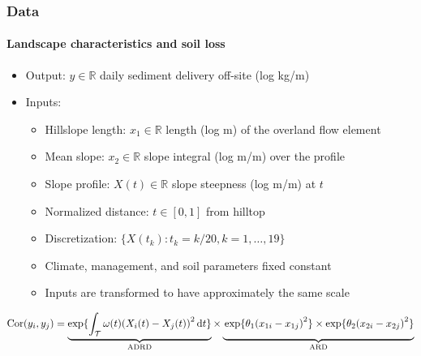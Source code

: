 \documentclass{snedecorbeamer}
\begin{document}
\begin{frame}
  \frametitle{Data}
  \framesubtitle{Landscape characteristics and soil loss}

  \begin{itemize}
  \item Output: $y\in\mathbb{R}$ daily sediment delivery off-site (log kg/m)
  \item Inputs:
    \begin{itemize}
    \item Hillslope length: $x_1\in\mathbb{R}$ length (log m) of the overland flow
      element
    \item Mean slope: $x_2\in\mathbb{R}$ slope integral (log m/m) over the profile
    \item Slope profile: $X(t)\in\mathbb{R}$ slope steepness (log m/m) at $t$
    \item Normalized distance: $t\in[0, 1]$ from hilltop
    \item Discretization: $\{X(t_k) : t_k = k / 20, k = 1, \dots, 19\}$
    \item Climate, management, and soil parameters fixed constant
    \item Inputs are transformed to have approximately the same scale
    \end{itemize}
  \end{itemize}

  \vfill

  $\mathrm{Cor}(y_i, y_j) =
  \underbrace{\exp\{
    \int_\mathcal{T}
    \omega(t){(X_i(t) - X_j(t))}^2\,\mathrm{d}t\}
  }_{\mathrm{ADRD}}
  \times
  \underbrace{
    \vphantom{\int_\mathcal{T}}
      \exp\{\theta_1 {(x_{1i} - x_{1j})}^2\}
  \times
  \exp\{\theta_2 {(x_{2i} - x_{2j})}^2\}
  }_{\mathrm{ARD}}$
\end{frame}
\end{document}
